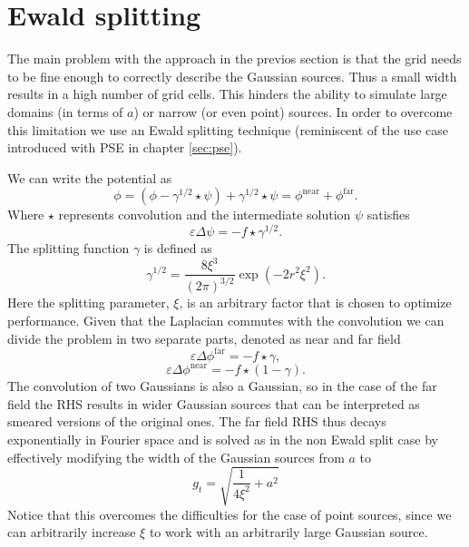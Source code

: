 \documentclass[ twoside,openright,titlepage,numbers=noenddot,%
headinclude,footinclude,cleardoublepage=empty,abstract=on,
BCOR=5mm,paper=a4,fontsize=11pt, dvipsnames
]{scrreprt}
\newcommand{\near}{\textrm{near}}
\newcommand{\far}{\textrm{far}}
\begin{document}
\section{Ewald splitting}\label{sec:tppoisson_ewald}
The main problem with the approach in the previos section is that the grid needs to be fine enough to correctly describe the Gaussian sources. Thus a small width results in a high number of grid cells. This hinders the ability to simulate large domains (in terms of $a$) or narrow (or even point) sources. In order to overcome this limitation we use an Ewald splitting technique\cite{ewaldsplit} (reminiscent of the use case introduced with \gls{PSE} in chapter \ref{sec:pse}).

We can write the potential as
\begin{equation}
 \phi=(\phi - \gamma^{1/2}\star\psi) + \gamma^{1/2}\star\psi = \phi^{\near} + \phi^{\far}.
\end{equation}
Where $\star$ represents convolution and the intermediate solution $\psi$ satisfies
 \begin{equation}
 \varepsilon\Delta\psi=-f\star\gamma^{1/2}.
\end{equation}   
The splitting function $\gamma$ is defined as
 \begin{equation}
 \gamma^{1/2} = \frac{8\xi^3}{(2\pi)^{3/2}}\exp\left(-2r^2\xi^2\right).
\end{equation}
Here the splitting parameter, $\xi$, is an arbitrary factor that is chosen to optimize performance. 
Given that the Laplacian commutes with the convolution we can divide the problem in two separate parts, denoted as near and far field  
 \begin{equation}
 \varepsilon\Delta\phi^{\far}=-f\star\gamma,
\end{equation}   
\begin{equation}
 \label{tppoisson_ewald_near}
 \varepsilon\Delta\phi^{\near}=-f\star(1-\gamma).
\end{equation}   
The convolution of two Gaussians is also a Gaussian, so in the case of the far field the RHS results in wider Gaussian sources that can be interpreted as smeared versions of the original ones. The far field RHS thus decays exponentially in Fourier space and is solved as in the non Ewald split case by effectively modifying the width of the Gaussian sources from $a$ to
\begin{equation}
  g_t = \sqrt{\frac{1}{4\xi^2} + a^2}
\end{equation}
Notice that this overcomes the difficulties for the case of point sources, since we can arbitrarily increase $\xi$ to work with an arbitrarily large Gaussian source.
\end{document}
